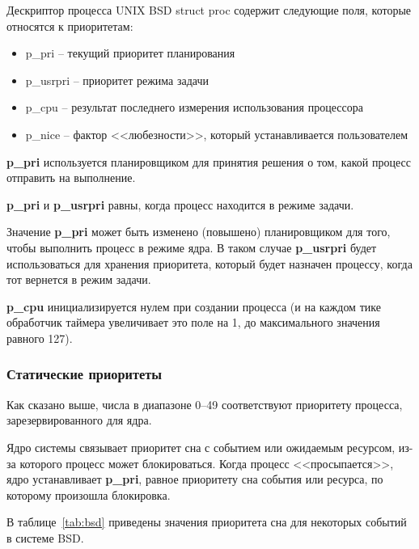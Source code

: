 Дескриптор процесса UNIX BSD struct proc содержит следующие поля, которые относятся к приоритетам:
\begin{itemize}
	\item p\_pri -- текущий приоритет планирования
	\item p\_usrpri -- приоритет режима задачи
	\item p\_cpu -- результат последнего измерения использования процессора
	\item p\_nice -- фактор <<любезности>>, который устанавливается пользователем
\end{itemize}

\textbf{p\_pri} используется планировщиком для принятия решения о том, какой процесс отправить на выполнение. 

\textbf{p\_pri} и \textbf{p\_usrpri} равны, когда процесс находится в режиме задачи. 

Значение \textbf{p\_pri} может быть изменено (повышено) планировщиком для того, чтобы выполнить процесс в режиме ядра. В таком случае \textbf{p\_usrpri} будет использоваться для хранения приоритета, который будет назначен процессу, когда тот вернется в режим задачи.

\textbf{p\_cpu} инициализируется нулем при создании процесса (и на каждом тике обработчик таймера увеличивает это поле на 1, до максимального значения равного 127).

\subsubsection{Статические приоритеты}

Как сказано выше, числа в диапазоне 0--49 соответствуют приоритету процесса, зарезервированного для ядра. 

Ядро системы связывает приоритет сна с событием или ожидаемым ресурсом, из-за которого процесс может блокироваться. Когда процесс <<просыпается>>, ядро устанавливает \textbf{p\_pri}, равное приоритету сна события или ресурса, по которому произошла блокировка. 

В таблице~\ref{tab:bsd} приведены значения приоритета сна для некоторых событий в системе BSD.

